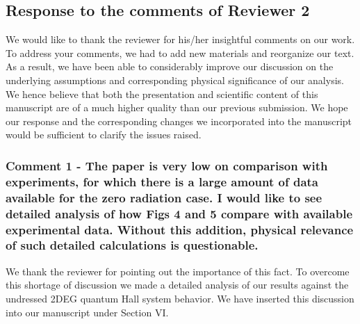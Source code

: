 \documentclass{article}
\begin{document}
\newpage
\subsection*{Response to the comments of Reviewer 2}

We would like to thank the reviewer for his/her insightful comments on our work. To address your comments, we had to add new materials and reorganize our text. As a result, we have been able to considerably improve our discussion on the underlying assumptions and corresponding physical significance of our analysis. We hence believe that both the presentation and scientific content of this manuscript are of a much higher quality than our previous submission. We hope our response and the corresponding changes we incorporated into the manuscript would be sufficient to clarify the issues raised.


\subsubsection*{Comment 1 -
\color{RoyalBlue} The paper is very low on comparison with experiments, for which there is a large amount of data available for the zero radiation case. I would like to see detailed analysis of how Figs 4 and 5 compare with available
experimental data. Without this addition, physical relevance of such
detailed calculations is questionable.
}

We thank the reviewer for pointing out the importance of this fact. To overcome this shortage of discussion we made a detailed analysis of our results against the undressed 2DEG quantum Hall system behavior. We have inserted this discussion into our manuscript under Section VI.
\end{document}
